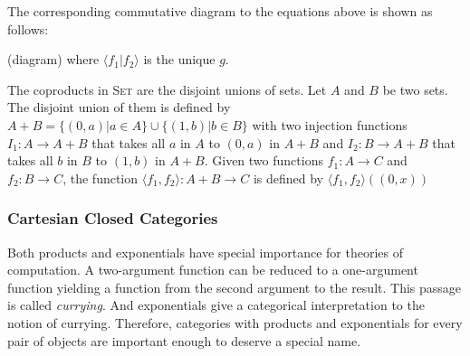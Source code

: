 The corresponding commutative diagram to the equations above is shown as follows:

(diagram)
where $ \langle f_1 | f_2 \rangle $ is the unique $ g $.

The coproducts in \textsc{Set} are the disjoint unions of sets. Let $ A $ and $ B $ be two sets. The disjoint union of them is defined by $ A+B = \{ (0,a) | a \in A \} \cup \{ (1,b) | b \in B \} $ with two injection functions $ I_1 : A \to A+B $ that takes all $ a $ in $ A $ to $ (0,a) $ in $ A+B $ and $ I_2 : B \to A+B $ that takes all $ b $ in $ B $ to $ (1,b) $ in $ A+B $. Given two functions $ f_1 : A \to C $ and $ f_2 : B \to C $, the function $ \langle f_1 , f_2 \rangle : A+B \to C $ is defined by $ \langle f_1 , f_2 \rangle (( 0,x )) $



\subsubsection{Cartesian Closed Categories}
\label{sec:bg_cat_ccc}
Both products and exponentials have special importance for theories of computation. A two-argument function can be reduced to a one-argument function yielding a function from the second argument to the result. This passage is called \emph{currying}. And exponentials give a categorical interpretation to the notion of currying. Therefore, categories with products and exponentials for every pair of objects are important enough to deserve a special name.